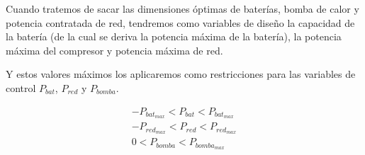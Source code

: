 Cuando tratemos de sacar las dimensiones óptimas de baterías, bomba de calor y
potencia contratada de red, tendremos como variables de diseño la capacidad de
la batería (de la cual se deriva la potencia máxima de la batería), la potencia
máxima del compresor y potencia máxima de red.

Y estos valores máximos los aplicaremos como restricciones para las variables
de control $P_{bat}$, $P_{red}$ y $P_{bomba}$.

\begin{align}
	-P_{bat_{max}} < P_{bat} < P_{bat_{max}} \\
	-P_{red_{max}} < P_{red} < P_{red_{max}} \\
	0 < P_{bomba} < P_{bomba_{max}}
\end{align}
